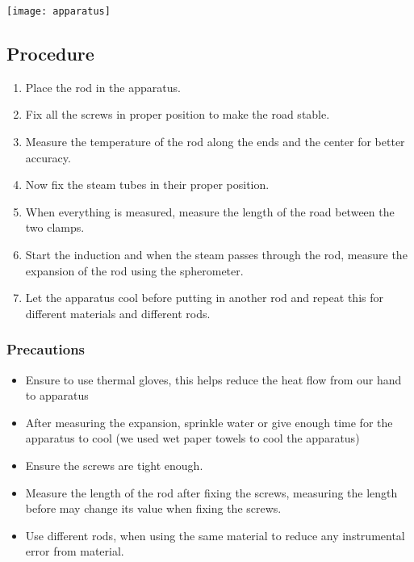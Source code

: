 \documentclass[%
 sor,
 jor,
 amsmath,amssymb,
 reprint,
]{revtex4-2}
\begin{document}
\begin{center}
\texttt{[image: apparatus]}
\end{center}

\subsection{Procedure}
\begin{enumerate}
	\item Place the rod in the apparatus.
	\item Fix all the screws in proper position to make the road stable. 
	\item Measure the temperature of the rod along the ends and the center for better accuracy.
	\item Now fix the steam tubes in their proper position.
	\item When everything is measured, measure the length of the road between the two clamps.
	\item Start the induction and when the steam passes through the rod, measure the expansion of the rod using the spherometer. 
	\item Let the apparatus cool before putting in another rod and repeat this for different materials and different rods.
\end{enumerate}
\subsubsection{Precautions}
\begin{itemize}
	\item Ensure to use thermal gloves, this helps reduce the heat flow from our hand to apparatus
	\item After measuring the expansion, sprinkle water or give enough time for the apparatus to cool (we used wet paper towels to cool the apparatus)
	\item Ensure the screws are tight enough. 
	\item Measure the length of the rod after fixing the screws, measuring the length before may change its value when fixing the screws.
	\item Use different rods, when using the same material to reduce any instrumental error from material.
\end{itemize}
\end{document}
